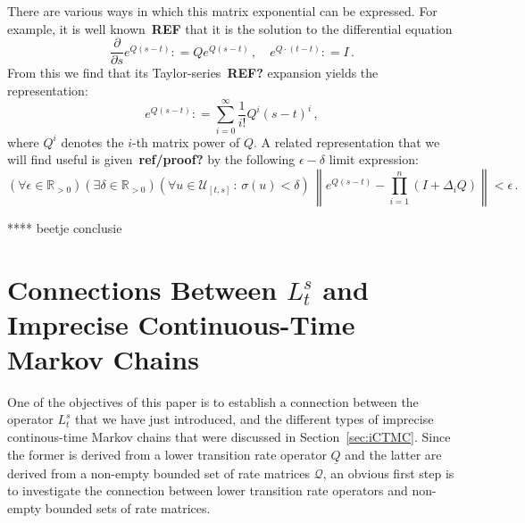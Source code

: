 \documentclass[10pt]{paper}
\theoremstyle{definition}
\newcommand{\reals}{\mathbb{R}}
\newcommand{\realspos}{\reals_{>0}}
\newcommand{\lbound}{L}
\newcommand{\rateset}{\mathcal{Q}}
\newcommand{\lrate}{\underline{Q}}
\newcommand{\norm}[1]{\left\lVert #1 \right\rVert}
\newcommand{\coloneqq}{:\!=}
\begin{document}
There are various ways in which this matrix exponential can be expressed. For example, it is well known~{\bf REF} that it is the solution to the differential equation
\begin{equation*}
\frac{\partial }{\partial s}e^{Q(s-t)}\coloneqq Qe^{Q(s-t)}\,,\quad e^{Q\cdot (t-t)} \coloneqq I\,.
\end{equation*}
From this we find that its Taylor-series~{\bf REF?} expansion yields the representation:
\begin{equation*}
e^{Q(s-t)} \coloneqq \sum_{i=0}^{\infty}\frac{1}{i!}Q^i(s-t)^i\,,
\end{equation*}
where $Q^i$ denotes the $i$-th matrix power of $Q$.
A related representation that we will find useful is given~{\bf ref/proof?} by the following $\epsilon-\delta$ limit expression:
\begin{equation}\label{eq:matrix_exp_limit}
(\forall\epsilon\in\realspos)(\exists\delta\in\realspos)(\forall u\in\mathcal{U}_{[t,s]}\,:\,\sigma(u)<\delta)\,\norm{e^{Q(s-t)} - \prod_{i=1}^n(I+\Delta_iQ)} < \epsilon\,.
\end{equation}

**** beetje conclusie

\section{Connections Between $L_t^s$ and Imprecise Continuous-Time Markov Chains}\label{sec:connections}

One of the objectives of this paper is to establish a connection between the operator $\lbound_t^s$ that we have just introduced, and the different types of imprecise continous-time Markov chains that were discussed in Section~\ref{sec:iCTMC}. Since the former is derived from a lower transition rate operator $\lrate$ and the latter are derived from a non-empty bounded set of rate matrices $\rateset$, an obvious first step is to investigate the connection between lower transition rate operators and non-empty bounded sets of rate matrices.
\end{document}
